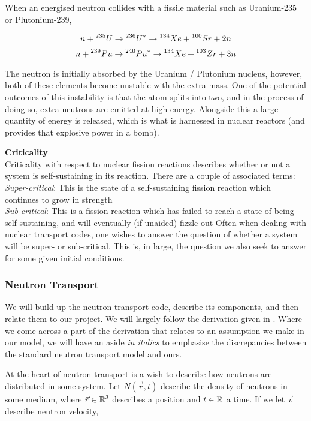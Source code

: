When an energised neutron collides with a fissile material such as Uranium-235 or Plutonium-239, 

$$n + \prescript{235}{}U \to \prescript{236}{}U^{*} \to \prescript{134}{}Xe + \prescript{100}{}Sr + 2n$$
$$n + \prescript{239}{}Pu \to \prescript{240}{}Pu^{*} \to \prescript{134}{}Xe + \prescript{103}{}Zr + 3n$$

The neutron is initially absorbed by the Uranium / Plutonium nucleus, however, both of these elements become 
unstable with the extra mass. One of the potential outcomes of this instability is that the atom splits into two, 
and in the process of doing so, extra neutrons are emitted at high energy. Alongside this a large quantity of energy is 
released, which is what is harnessed in nuclear reactors (and provides that explosive power in a bomb). 

\noindent \textbf{Criticality} \\
Criticality with respect to nuclear fission reactions describes whether or not a system is self-sustaining in its reaction. There 
are a couple of associated terms:\\
\noindent\textit{Super-critical}: This is the state of a self-sustaining fission reaction which continues to grow in strength\\
\noindent\textit{Sub-critical}: This is a fission reaction which has failed to reach a state of being self-sustaining, and will eventually 
(if unaided) fizzle out
Often when dealing with nuclear transport codes, one wishes to answer the question of whether a system will be super- or sub-critical. 
This is, in large, the question we also seek to answer for some given initial conditions. 

\subsubsection{Neutron Transport}

We will build up the neutron transport code, describe its components, and then relate them to our project. We will largely 
follow the derivation given in \cite{mc-methods-neutron-transport-phd}. Where we come across a part of the derivation 
that relates to an assumption we make in our model, we will have an aside \textit{in italics} to emphasise the 
discrepancies between the standard neutron transport model and ours.

At the heart of neutron transport is a wish to describe how neutrons are distributed in some system. Let $N(\vec{r}, t)$ 
describe the density of neutrons in some medium, where $\vec{r} \in \mathbb{R}^3$ describes a position and $t \in \mathbb{R}$ a time. If we let 
$\vec{v}$ describe neutron velocity, 

